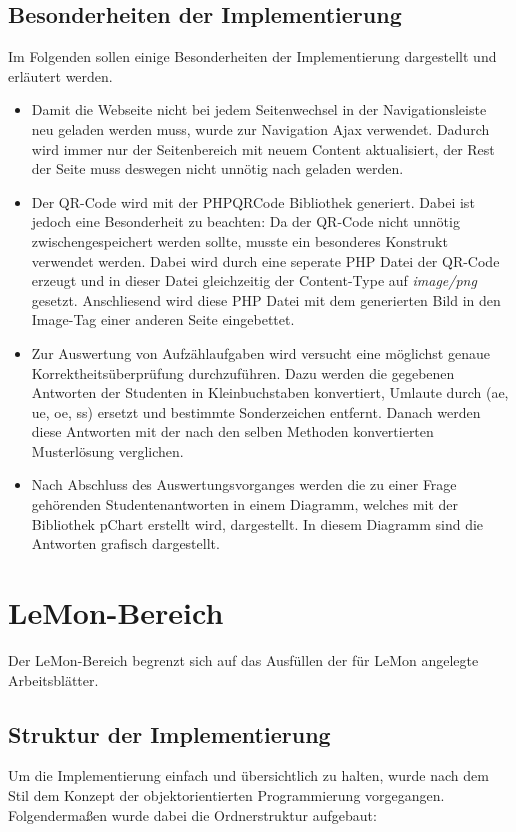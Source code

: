 \subsection{Besonderheiten der Implementierung}
Im Folgenden sollen einige Besonderheiten der Implementierung dargestellt und
erläutert werden.
\begin{singlespacing}
	\begin{itemize}
		\item Damit die Webseite nicht bei jedem Seitenwechsel in der Navigationsleiste
			neu geladen werden muss, wurde zur Navigation Ajax verwendet. Dadurch wird immer
			nur der Seitenbereich mit neuem Content aktualisiert, der Rest der Seite muss
			deswegen nicht unnötig nach geladen werden.
		\item Der QR-Code wird mit der \gls{PHPQRCode} Bibliothek generiert. Dabei ist
			jedoch eine Besonderheit zu beachten: Da der QR-Code nicht unnötig
			zwischengespeichert werden sollte, musste ein besonderes Konstrukt verwendet
			werden. Dabei wird durch eine seperate \gls{PHP} Datei der QR-Code erzeugt und in
			dieser Datei gleichzeitig der Content-Type auf \emph{image/png} gesetzt.
			Anschliesend wird diese \gls{PHP} Datei mit dem generierten Bild in den Image-Tag
			einer anderen Seite eingebettet.
		\item Zur Auswertung von Aufzählaufgaben wird versucht eine möglichst genaue
			Korrektheitsüberprüfung durchzuführen. Dazu werden die gegebenen Antworten der
			Studenten in Kleinbuchstaben konvertiert, Umlaute durch (ae, ue, oe, ss) ersetzt
			und bestimmte Sonderzeichen entfernt. Danach werden diese Antworten mit der nach
			den selben Methoden konvertierten Musterlösung verglichen.
		\item Nach Abschluss des Auswertungsvorganges werden die zu einer Frage
			gehörenden Studentenantworten in einem Diagramm, welches mit der Bibliothek
			\gls{pChart} erstellt wird, dargestellt. In diesem Diagramm sind die Antworten
			grafisch dargestellt.
	\end{itemize}
\end{singlespacing}



\section{LeMon-Bereich}
Der \gls{LeMon}-Bereich begrenzt sich auf das Ausfüllen der für \gls{LeMon} angelegte Arbeitsblätter.
\subsection{Struktur der Implementierung}
Um die Implementierung einfach und übersichtlich zu halten, wurde nach dem Stil
dem Konzept der objektorientierten Programmierung vorgegangen.\\
Folgendermaßen wurde dabei die Ordnerstruktur aufgebaut:

